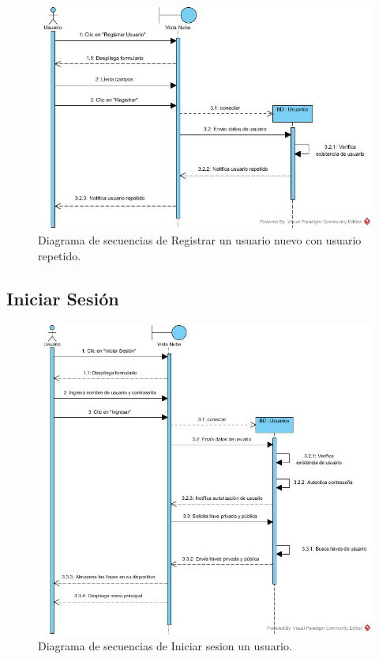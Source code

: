 \begin{figure}[htbp!]
		\centering
			\includegraphics[width=1\textwidth]{images/Registrar_trayectoria_c}
		\caption{Diagrama de secuencias de Registrar un usuario nuevo con usuario repetido.}
\end{figure} 
\newpage

\subsection{Iniciar Sesión}

\begin{figure}[htbp!]
		\centering
			\includegraphics[width=1\textwidth]{images/Iniciar_sesion}
		\caption{Diagrama de secuencias de Iniciar sesion un usuario.}
\end{figure}

